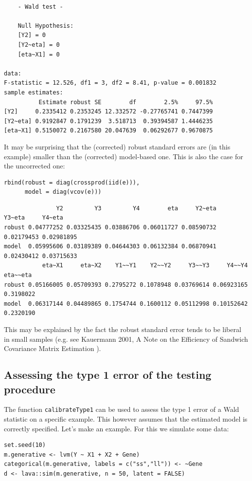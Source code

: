 \documentclass[12pt]{article}
\begin{document}
\begin{verbatim}

	- Wald test -

	Null Hypothesis:
	[Y2] = 0
	[Y2~eta] = 0
	[eta~X1] = 0

data:  
F-statistic = 12.526, df1 = 3, df2 = 8.41, p-value = 0.001832
sample estimates:
          Estimate robust SE        df        2.5%     97.5%
[Y2]     0.2335412 0.2353245 12.332572 -0.27765741 0.7447399
[Y2~eta] 0.9192847 0.1791239  3.518713  0.39394587 1.4446235
[eta~X1] 0.5150072 0.2167580 20.047639  0.06292677 0.9670875
\end{verbatim}

It may be surprising that the (corrected) robust standard errors are
(in this example) smaller than the (corrected) model-based one. This
is also the case for the uncorrected one:
\lstset{language=r,label= ,caption= ,captionpos=b,numbers=none}
\begin{lstlisting}
rbind(robust = diag(crossprod(iid(e))),
      model = diag(vcov(e)))
\end{lstlisting}

\begin{verbatim}
               Y2         Y3         Y4        eta     Y2~eta     Y3~eta     Y4~eta
robust 0.04777252 0.03325435 0.03886706 0.06011727 0.08590732 0.02179453 0.02981895
model  0.05995606 0.03189389 0.04644303 0.06132384 0.06870941 0.02430412 0.03715633
           eta~X1     eta~X2    Y1~~Y1    Y2~~Y2     Y3~~Y3     Y4~~Y4  eta~~eta
robust 0.05166005 0.05709393 0.2795272 0.1078948 0.03769614 0.06923165 0.3198022
model  0.06317144 0.04489865 0.1754744 0.1600112 0.05112998 0.10152642 0.2320190
\end{verbatim}


This may be explained by the fact the robust standard error tends to
be liberal in small samples (e.g. see Kauermann 2001, A Note on the
Efficiency of Sandwich Covariance Matrix Estimation ).

\subsection{Assessing the type 1 error of the testing procedure}
\label{sec:org6009aeb}

The function \texttt{calibrateType1} can be used to assess the type 1 error
of a Wald statistic on a specific example. This however assumes that
the estimated model is correctly specified. Let's make an example. For
this we simulate some data:
\lstset{language=r,label= ,caption= ,captionpos=b,numbers=none}
\begin{lstlisting}
set.seed(10)
m.generative <- lvm(Y ~ X1 + X2 + Gene)
categorical(m.generative, labels = c("ss","ll")) <- ~Gene
d <- lava::sim(m.generative, n = 50, latent = FALSE)
\end{lstlisting}
\end{document}
